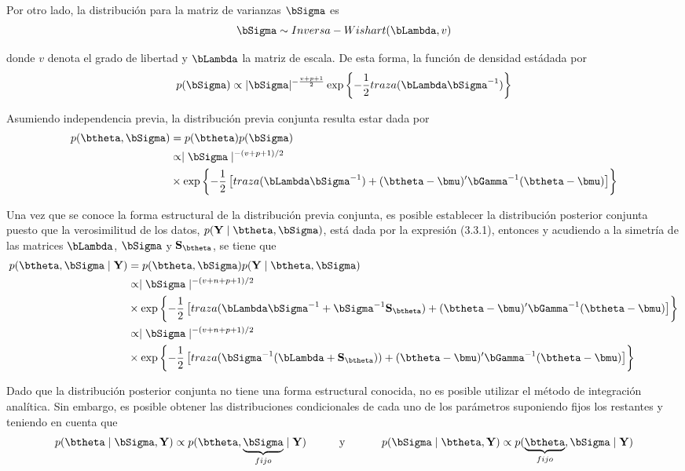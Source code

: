 Por otro lado, la distribución para la matriz de varianzas $\bSigma$ es
\begin{equation*}
\bSigma \sim Inversa-Wishart(\bLambda,v)
\end{equation*}

donde $v$ denota el grado de libertad y $\bLambda$ la matriz de escala. De esta forma, la función de densidad estádada por
\begin{equation*}
p(\bSigma)\propto |\bSigma|^{-\frac{v+p+1}{2}}\exp\left\{-\frac{1}{2}traza(\bLambda\bSigma^{-1})\right\}
\end{equation*}

Asumiendo independencia previa, la distribución previa conjunta resulta estar dada por
\begin{align}
p(\btheta,\bSigma)&=p(\btheta)p(\bSigma)\notag\\
&\propto \mid \bSigma \mid ^{-(v+p+1)/2}\notag\\
&\times
\exp\left\{ -\frac{1}{2}\left[traza(\bLambda\bSigma^{-1})+
(\btheta-\bmu)'\bGamma^{-1}(\btheta-\bmu)\right]\right\}
\end{align}


Una vez que se conoce la forma estructural de la distribución previa conjunta, es posible establecer la distribución posterior conjunta puesto que la verosimilitud de los datos, $p(\mathbf{Y} \mid \btheta,\bSigma)$, está dada por la expresión (3.3.1), entonces y acudiendo a la simetría de las matrices $\bLambda$, $\bSigma$ y $\mathbf{S}_{\btheta}$, se tiene que
\begin{align}
p(\btheta,\bSigma \mid \mathbf{Y})&=p(\btheta,\bSigma)p(\mathbf{Y} \mid \btheta,\bSigma)\notag\\
&\propto \mid \bSigma \mid ^{-(v+n+p+1)/2}\notag\\
&\times
\exp\left\{ -\frac{1}{2}\left[traza(\bLambda\bSigma^{-1}+\bSigma^{-1}\mathbf{S}_{\btheta})+
                                (\btheta-\bmu)'\bGamma^{-1}(\btheta-\bmu)\right]\right\}\notag\\
                              &\propto \mid \bSigma \mid ^{-(v+n+p+1)/2}\notag\\
                              &\times
                              \exp\left\{ -\frac{1}{2}\left[traza(\bSigma^{-1}(\bLambda+\mathbf{S}_{\btheta}))+
                              (\btheta-\bmu)'\bGamma^{-1}(\btheta-\bmu)\right]\right\}
\end{align}

Dado que la distribución posterior conjunta no tiene una forma estructural conocida, no es posible utilizar el método de integración analítica. Sin embargo, es posible obtener las distribuciones condicionales de cada uno de los parámetros suponiendo fijos los restantes y teniendo en cuenta que
\begin{align*}
p(\btheta \mid \bSigma,\mathbf{Y})\propto p(\btheta,\underbrace{\bSigma}_{fijo} \mid \mathbf{Y})
\ \ \ \ \ \ \ \ \ \text{y} \ \ \ \ \ \ \ \ \ \
p(\bSigma \mid \btheta,\mathbf{Y})\propto p(\underbrace{\btheta}_{fijo},\bSigma \mid \mathbf{Y})
\end{align*}

